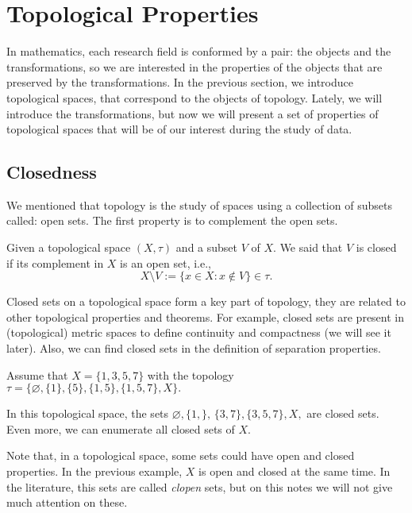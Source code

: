 \documentclass[
	fontsize=10pt, %
	twoside=false, %
	secnumdepth=1, %
]{kaobook}
\begin{document}
\section{Topological Properties}

In mathematics, each research field is conformed by a pair: the objects and the transformations, so we are interested in the properties of the objects that are preserved by the transformations. In the previous section, we introduce topological spaces, that correspond to the objects of topology. Lately, we will introduce the transformations, but now we will present a set of properties of topological spaces that will be of our interest during the study of data.


\subsection{Closedness}

We mentioned that topology is the study of spaces using a collection of subsets called: open sets. The first property is to complement the open sets. 

\begin{definition} 
Given a topological space $(X,\tau)$ and a subset $V$ of $X.$ We said that $V$ is closed if its complement in $X$ is an open set, i.e., $$X\setminus V:= \{x\in X: x\not\in V\}\in \tau.$$
\end{definition}

Closed sets on a topological space form a key part of topology, they are related to other topological properties and theorems. For example, closed sets are present in (topological) metric spaces to define continuity and compactness (we will see it later). Also, we can find closed sets in the definition of separation properties. 

\begin{example}
Assume that $X=\{1,3,5,7\}$ with the topology $\tau=\{\varnothing,\{1\},\{5\},\{1,5\},\{1,5,7\},X\}.$ 

In this topological space, the sets $\varnothing, \{1,\},\,\{3,7\},\{3,5,7\}, X,$ are closed sets. Even more, we can enumerate all closed sets of $X.$ 
\end{example}

Note that, in a topological space, some sets could have open and closed properties. In the previous example, $X$ is open and closed at the same time. In the literature, this sets are called \emph{clopen} sets, but on this notes we will not give much attention on these.
\end{document}
